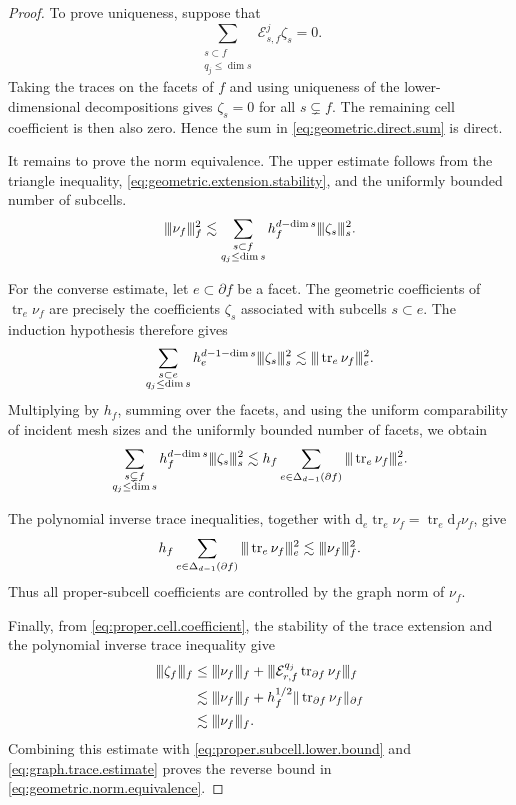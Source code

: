 \documentclass[a4paper,11pt]{article}
\theoremstyle{definition}
\newcommand{\DIFF}{\mathrm{d}}
\newcommand{\FM}[1]{\Delta_{#1}}
\newcommand{\trc}{\operatorname{tr}}
\newcommand{\vvvert}{\vert\kern-0.25ex\vert\kern-0.25ex\vert}
\begin{document}
\begin{proof}
To prove uniqueness, suppose that
\[
  \sum_{\substack{
    s\subset f\\
    q_j\leq\dim s
  }}
  \mathcal E_{s,f}^j\zeta_s
  =0.
\]
Taking the traces on the facets of $f$ and using uniqueness of the lower-dimensional decompositions gives $\zeta_s=0$ for all $s\subsetneq f$.
The remaining cell coefficient is then also zero.
Hence the sum in \eqref{eq:geometric.direct.sum} is direct.

It remains to prove the norm equivalence.
The upper estimate follows from the triangle inequality, \eqref{eq:geometric.extension.stability}, and the uniformly bounded number of subcells.
\[
  \vvvert\nu_f\vvvert_f^2
  \lesssim
  \sum_{\substack{
    s\subset f\\
    q_j\leq\dim s
  }}
  h_f^{d-\dim s}
  \vvvert\zeta_s\vvvert_s^2.
\]

For the converse estimate, let $e\subset\partial f$ be a facet.
The geometric coefficients of $\trc_e\nu_f$ are precisely the coefficients $\zeta_s$ associated with subcells $s\subset e$.
The induction hypothesis therefore gives
\[
  \sum_{\substack{
    s\subset e\\
    q_j\leq\dim s
  }}
  h_e^{d-1-\dim s}
  \vvvert\zeta_s\vvvert_s^2
  \lesssim
  \vvvert
  \trc_e\nu_f
  \vvvert_e^2.
\]
Multiplying by $h_f$, summing over the facets, and using the uniform comparability of incident mesh sizes and the uniformly bounded number of facets, we obtain
\begin{equation}\label{eq:proper.subcell.lower.bound}
  \sum_{\substack{
    s\subsetneq f\\
    q_j\leq\dim s
  }}
  h_f^{d-\dim s}
  \vvvert\zeta_s\vvvert_s^2
  \lesssim
  h_f
  \sum_{e\in\FM{d-1}(\partial f)}
  \vvvert
  \trc_e\nu_f
  \vvvert_e^2.
\end{equation}

The polynomial inverse trace inequalities, together with $\DIFF_e\trc_e\nu_f=\trc_e\DIFF_f\nu_f$, give
\begin{equation}\label{eq:graph.trace.estimate}
  h_f
  \sum_{e\in\FM{d-1}(\partial f)}
  \vvvert
  \trc_e\nu_f
  \vvvert_e^2
  \lesssim
  \vvvert\nu_f\vvvert_f^2.
\end{equation}
Thus all proper-subcell coefficients are controlled by the graph norm of $\nu_f$.

Finally, from \eqref{eq:proper.cell.coefficient}, the stability of the trace extension and the polynomial inverse trace inequality give
\[
\begin{aligned}
  \vvvert\zeta_f\vvvert_f
  &\leq
  \vvvert\nu_f\vvvert_f
  +
  \vvvert
  \mathcal E_{r,f}^{q_j}
  \trc_{\partial f}\nu_f
  \vvvert_f
  \\
  &\lesssim
  \vvvert\nu_f\vvvert_f
  +
  h_f^{1/2}
  \|\trc_{\partial f}\nu_f\|_{\partial f}
  \\
  &\lesssim
  \vvvert\nu_f\vvvert_f.
\end{aligned}
\]
Combining this estimate with \eqref{eq:proper.subcell.lower.bound} and \eqref{eq:graph.trace.estimate} proves the reverse bound in \eqref{eq:geometric.norm.equivalence}.
\end{proof}
\end{document}
